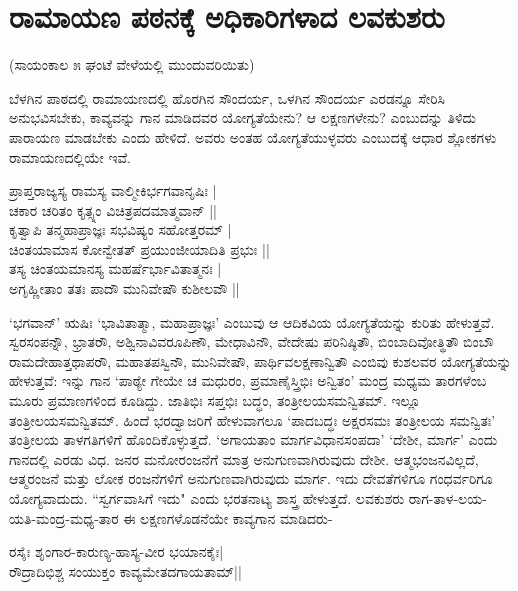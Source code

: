 \section*{ರಾಮಾಯಣ ಪಠನಕ್ಕೆ ಅಧಿಕಾರಿಗಳಾದ ಲವಕುಶರು} 

\begin{center} 
(ಸಾಯಂಕಾಲ ೫ ಘಂಟೆ ವೇಳೆಯಲ್ಲಿ ಮುಂದುವರಿಯಿತು) 
\end{center} 


ಬೆಳಗಿನ ಪಾಠದಲ್ಲಿ ರಾಮಾಯಣದಲ್ಲಿ ಹೊರಗಿನ ಸೌಂದರ್ಯ, ಒಳಗಿನ ಸೌಂದರ್ಯ ಎರಡನ್ನೂ ಸೇರಿಸಿ ಅನುಭವಿಸಬೇಕು, ಕಾವ್ಯವನ್ನು ಗಾನ ಮಾಡಿದವರ ಯೋಗ್ಯತೆಯೇನು? ಆ ಲಕ್ಷಣಗಳೇನು? ಎಂಬುದನ್ನು ತಿಳಿದು ಪಾರಾಯಣ ಮಾಡಬೇಕು ಎಂದು ಹೇಳಿದೆ. ಅವರು ಅಂತಹ ಯೋಗ್ಯತೆಯುಳ್ಳವರು ಎಂಬುದಕ್ಕೆ ಆಧಾರ ಶ್ಲೋಕಗಳು ರಾಮಾಯಣದಲ್ಲಿಯೇ ಇವೆ. 

\begin{shloka}
ಪ್ರಾಪ್ತರಾಜ್ಯಸ್ಯ ರಾಮಸ್ಯ ವಾಲ್ಮೀಕಿರ್ಭಗವಾನೃಷಿಃ |\label{188a}\\ 
ಚಕಾರ ಚರಿತಂ ಕೃತ್ಸ್ನಂ ವಿಚಿತ್ರಪದಮಾತ್ಮವಾನ್‍ ||\\
ಕೃತ್ವಾಪಿ ತನ್ಮಹಾಪ್ರಾಜ್ಞಃ ಸಭವಿಷ್ಯಂ ಸಹೋತ್ತರಮ್‍ |\\ 
ಚಿಂತಯಾಮಾಸ ಕೋನ್ವೇತತ್‍ ಪ್ರಯುಂಜೀಯಾದಿತಿ ಪ್ರಭುಃ ||\\ 
ತಸ್ಯ ಚಿಂತಯಮಾನಸ್ಯ ಮಹರ್ಷೆರ್ಭಾವಿತಾತ್ಮನಃ |\\ 
ಅಗೃಹ್ಣೀತಾಂ ತತಃ ಪಾದೌ ಮುನಿವೇಷೌ ಕುಶೀಲವೌ ||
\end{shloka}

`ಭಗವಾನ್‍' ಋಷಿಃ `ಭಾವಿತಾತ್ಮಾ, ಮಹಾಪ್ರಾಜ್ಞಃ' ಎಂಬುವು ಆ ಆದಿಕವಿಯ ಯೋಗ್ಯತೆಯನ್ನು ಕುರಿತು ಹೇಳುತ್ತವೆ. ಸ್ವರಸಂಪನ್ನೌ, ಭ್ರಾತರೌ, ಅಶ್ವಿನಾವಿವರೂಪಿಣೌ, ಮೇಧಾವಿನೌ, ವೇದೇಷು ಪರಿನಿಷ್ಠಿತೌ, ಬಿಂಬಾದಿವೋತ್ಥಿತೌ ಬಿಂಬೌ ರಾಮದೇಹಾತ್ತಥಾಪರೌ, ಮಹಾತಪಸ್ವಿನೌ, ಮುನಿವೇಷೌ, ಪಾರ್ಥಿವಲಕ್ಷಣಾನ್ವಿತೌ ಎಂಬಿವು ಕುಶಲವರ ಯೋಗ್ಯತೆಯನ್ನು ಹೇಳುತ್ತವೆ: ಇನ್ನು ಗಾನ `ಪಾಠ್ಯೇ ಗೇಯೇ ಚ ಮಧುರಂ, ಪ್ರಮಾಣೈಸ್ತ್ರಿಭಿಃ ಅನ್ವಿತಂ' ಮಂದ್ರ ಮಧ್ಯಮ ತಾರಗಳೆಂಬ ಮೂರು ಪ್ರಮಾಣಗಳಿಂದ ಕೂಡಿದ್ದು. ಜಾತಿಭಿಃ ಸಪ್ತಭಿಃ ಬದ್ಧಂ, ತಂತ್ರೀಲಯಸಮನ್ವಿತಮ್‍. ಇಲ್ಲೂ ತಂತ್ರೀಲಯಸಮನ್ವಿತಮ್‍. ಹಿಂದೆ ಭರದ್ವಾಜರಿಗೆ ಹೇಳುವಾಗಲೂ `ಪಾದಬದ್ಧಃ ಅಕ್ಷರಸಮಃ ತಂತ್ರೀಲಯ ಸಮನ್ವಿತಃ' ತಂತ್ರೀಲಯ ತಾಳಗತಿಗಳಿಗೆ ಹೊಂದಿಕೊಳ್ಳುತ್ತದೆ. `ಅಗಾಯತಾಂ ಮಾರ್ಗವಿಧಾನಸಂಪದಾ'\label{188} `ದೇಶೀ, ಮಾರ್ಗ' ಎಂದು ಗಾನದಲ್ಲಿ ಎರಡು ವಿಧ. ಜನರ ಮನೋರಂಜನೆಗೆ ಮಾತ್ರ ಅನುಗುಣವಾಗಿರುವುದು ದೇಶೀ. ಆತ್ಮಭಂಜನವಿಲ್ಲದೆ, ಆತ್ಮರಂಜನೆ ಮತ್ತು ಲೋಕ ರಂಜನೆಗಳಿಗೆ ಅನುಗುಣವಾಗಿರುವುದು ಮಾರ್ಗ. ಇದು ದೇವತೆಗಳಿಗೂ ಗಂಧರ್ವರಿಗೂ ಯೋಗ್ಯವಾದುದು. ``ಸ್ವರ್ಗವಾಸಿಗೆ ಇದು" ಎಂದು ಭರತನಾಟ್ಯ ಶಾಸ್ತ್ರ ಹೇಳುತ್ತದೆ. ಲವಕುಶರು ರಾಗ-ತಾಳ-ಲಯ-ಯತಿ-ಮಂದ್ರ-ಮಧ್ಯ-ತಾರ ಈ ಲಕ್ಷಣಗಳೊಡನೆಯೇ ಕಾವ್ಯಗಾನ ಮಾಡಿದರು- 

\begin{shloka} 
ರಸೈಃ ಶೃಂಗಾರ-ಕಾರುಣ್ಯ-ಹಾಸ್ಯ-ವೀರ ಭಯಾನಕೈಃ|\label{188b}\\ 
ರೌದ್ರಾದಿಭಿಶ್ಚ ಸಂಯುಕ್ತಂ ಕಾವ್ಯಮೇತದಗಾಯತಾಮ್‍||
\end{shloka}

